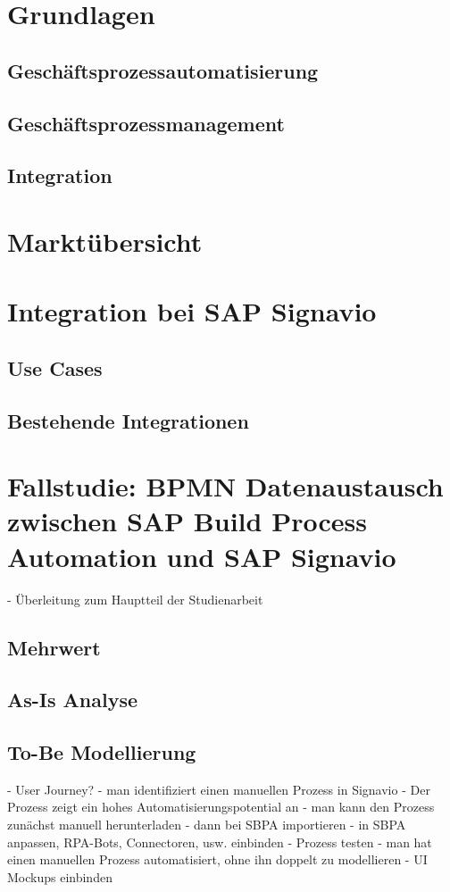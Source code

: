 \chapter{Grundlagen}
    \section{Geschäftsprozessautomatisierung}
    \section{Geschäftsprozessmanagement}
    \section{Integration}
\chapter{Marktübersicht}
\chapter{Integration bei SAP Signavio}
    \section{Use Cases}
    \section{Bestehende Integrationen}
\chapter{Fallstudie: BPMN Datenaustausch zwischen SAP Build Process Automation und SAP Signavio}

    - Überleitung zum Hauptteil der Studienarbeit


    \section{Mehrwert}
    
    \section{As-Is Analyse}
    \section{To-Be Modellierung}
    - User Journey?
    - man identifiziert einen manuellen Prozess in Signavio
    - Der Prozess zeigt ein hohes Automatisierungspotential an
    - man kann den Prozess zunächst manuell herunterladen
    - dann bei SBPA importieren
    - in SBPA anpassen, RPA-Bots, Connectoren, usw. einbinden
    - Prozess testen
    - man hat einen manuellen Prozess automatisiert, ohne ihn doppelt zu modellieren
    - UI Mockups einbinden
